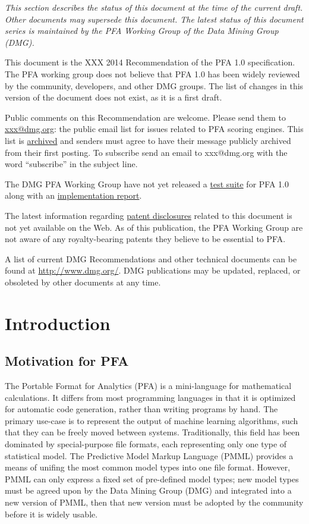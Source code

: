 \documentclass{article}
\begin{document}
{\it This section describes the status of this document at the time of the current draft.  Other documents may supersede this document.  The latest status of this document series is maintained by the PFA Working Group of the Data Mining Group (DMG).}

This document is the XXX 2014 Recommendation of the PFA 1.0 specification.  The PFA working group does not believe that PFA 1.0 has been widely reviewed by the community, developers, and other DMG groups.  The list of changes in this version of the document does not exist, as it is a first draft.

Public comments on this Recommendation are welcome.  Please send them to \href{http://FIXME}{xxx@dmg.org}: the public email list for issues related to PFA scoring engines.  This list is \href{http://FIXME}{archived} and senders must agree to have their message publicly archived from their first posting.  To subscribe send an email to xxx@dmg.org with the word ``subscribe'' in the subject line.

The DMG PFA Working Group have not yet released a \href{http://FIXME}{test suite} for PFA 1.0 along with an \href{http://FIXME}{implementation report}.

The latest information regarding \href{http://FIXME}{patent disclosures} related to this document is not yet available on the Web.  As of this publication, the PFA Working Group are not aware of any royalty-bearing patents they believe to be essential to PFA.

A list of current DMG Recommendations and other technical documents can be found at \url{http://www.dmg.org/}.  DMG publications may be updated, replaced, or obsoleted by other documents at any time.

\tableofcontents

\pagebreak

\section{Introduction}

\subsection{Motivation for PFA}

The Portable Format for Analytics (PFA) is a mini-language for mathematical calculations.  It differs from most programming languages in that it is optimized for automatic code generation, rather than writing programs by hand.  The primary use-case is to represent the output of machine learning algorithms, such that they can be freely moved between systems.  Traditionally, this field has been dominated by special-purpose file formats, each representing only one type of statistical model.  The Predictive Model Markup Language (PMML) provides a means of unifing the most common model types into one file format.  However, PMML can only express a fixed set of pre-defined model types; new model types must be agreed upon by the Data Mining Group (DMG) and integrated into a new version of PMML, then that new version must be adopted by the community before it is widely usable.
\end{document}

